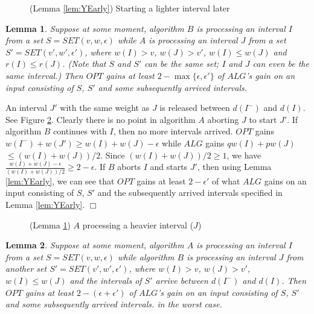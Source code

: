 \documentclass[11pt]{article}
\newtheorem{lemma}{Lemma}[section]
\newcommand{\qed}{\hspace*{\fill}$\Box$\par\medskip}
\newenvironment{proof}{\noindent{\it Proof. }\ignorespaces}{\qed}
\begin{document}
\begin{figure}
\centerline{ \epsfysize=0.9in  }
\caption{(Lemma \ref{lem:YEarly}) Starting a lighter interval later}
\label{fig:yearly}
\end{figure}

\begin{lemma} \label{lem:AHeavy}
Suppose at some moment, 
algorithm $B$ is processing an interval $I$ from
a set $S = SET(v, w, \epsilon)$
while $A$ is processing an interval $J$ from
a set $S' = SET(v', w', \epsilon')$,
where $w(I)>v$, $w(J)>v'$, $w(I) \leq w(J)$
and $r(I) \leq r(J)$.
(Note that $S$ and $S'$ can be the same set;
$I$ and $J$ can even be the same interval.)
Then $OPT$ gains at least $2-\max\{\epsilon, \epsilon'\}$
of $ALG$'s gain on an input consisting of $S$, $S'$
and some subsequently arrived intervals.
\end{lemma}

\begin{proof}
An interval $J'$ with the same weight as $J$ is released
between $d(I^-)$ and $d(I)$.
See Figure \ref{fig:aheavy}.
Clearly there is no point in algorithm $A$ aborting $J$ to
start $J'$.
If algorithm $B$ continues with $I$,
then no more intervals arrived.
$OPT$ gains $w(I^-) + w(J') \geq w(I) + w(J) - \epsilon$
while $ALG$ gains $q w(I) + p w(J)$ $\leq (w(I) + w(J))/2$.
Since $(w(I)+w(J))/2 \geq 1$,
we have $\frac{w(I)+w(J)-\epsilon}{(w(I)+w(J))/2} \geq 2-\epsilon$.
If $B$ aborts $I$ and starts $J'$,
then using Lemma \ref{lem:YEarly}, we can see that
$OPT$ gains at least $2-\epsilon'$ of what $ALG$ gains
on an input consisting of $S$, $S'$ and the subsequently
arrived intervals specified in Lemma \ref{lem:YEarly}.
\end{proof}

\begin{figure}
\centerline{ \epsfysize=0.9in  }
\caption{(Lemma \ref{lem:AHeavy}) $A$ processing a heavier interval ($J$)}
\label{fig:aheavy}
\end{figure}

\begin{lemma} \label{lem:ABSeparate}
Suppose at some moment, 
algorithm $A$ is processing an interval $I$ from
a set $S = SET(v, w, \epsilon)$ 
while algorithm $B$ is processing an interval $J$ from
another set $S' = SET(v', w', \epsilon')$, where $w(I)>v$,
$w(J)>v'$, $w(I) \leq w(J)$
and the intervals of $S'$ arrive between $d(I^-)$ and $d(I)$.
Then $OPT$ gains at least $2-(\epsilon+\epsilon')$ of $ALG$'s
gain on an input consisting of
$S$, $S'$ and some subsequently arrived intervals.
in the worst case.
\end{lemma}
\end{document}
